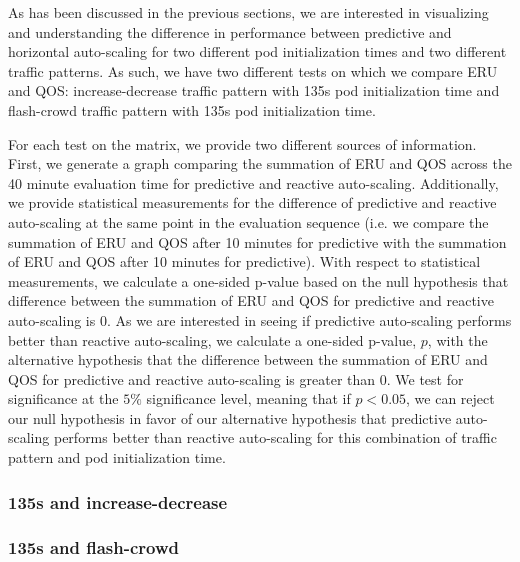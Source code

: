 As has been discussed in the previous sections, we are interested in visualizing
and understanding the difference in performance between predictive and
horizontal auto-scaling for two different pod initialization times and two
different traffic patterns. As such, we have two different tests on which we
compare ERU and QOS: increase-decrease traffic pattern with 135s pod
initialization time and flash-crowd traffic pattern with 135s pod initialization time.

For each test on the matrix, we provide two different sources of information.
First, we generate a graph comparing the summation of ERU and QOS across the 40
minute evaluation time for predictive and reactive auto-scaling. Additionally,
we provide statistical measurements for the difference of predictive and
reactive auto-scaling at the same point in the evaluation sequence (i.e. we
compare the summation of ERU and QOS after 10 minutes for predictive with the
summation of ERU and QOS after 10 minutes for predictive). With respect to
statistical measurements, we calculate a one-sided p-value
based on the null hypothesis that difference
between the summation of ERU and QOS for predictive and reactive auto-scaling is
$0$. As we are interested in seeing if predictive auto-scaling performs better
than reactive auto-scaling, we calculate a one-sided p-value, $p$, with the alternative
hypothesis that the difference between the summation of ERU and QOS for
predictive and reactive auto-scaling is greater than $0$. We test for
significance at the $5\%$ significance level, meaning that if $p < 0.05$, we can
reject our null hypothesis in favor of our alternative hypothesis that
predictive auto-scaling performs better than reactive auto-scaling for this
combination of traffic pattern and pod initialization time.

\subsubsection{135s and increase-decrease}



\subsubsection{135s and flash-crowd}


